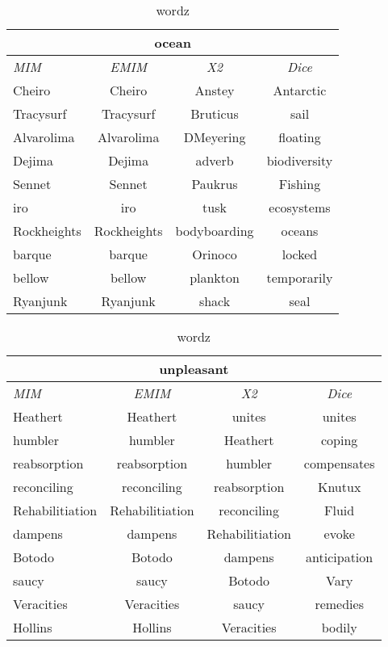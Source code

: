 \begin{table}[h!]
\centering
\begin{tabular}{ l | c | c | c }
\hline
\multicolumn{4}{c}{ocean}\\
\hline
\textit{MIM} & \textit{EMIM} & \textit{X2} & \textit{Dice}\\
\hline
Cheiro & Cheiro & Anstey & Antarctic\\
Tracysurf & Tracysurf & Bruticus & sail\\
Alvarolima & Alvarolima & DMeyering & floating\\
Dejima & Dejima & adverb & biodiversity\\
Sennet & Sennet & Paukrus & Fishing\\
iro & iro & tusk & ecosystems\\
Rockheights & Rockheights & bodyboarding & oceans\\
barque & barque & Orinoco & locked\\
bellow & bellow & plankton & temporarily\\
Ryanjunk & Ryanjunk & shack & seal\\
\hline
\end{tabular}
\caption{wordz}
\label{tab:words}
\end{table}
\begin{table}[h!]
\centering
\begin{tabular}{ l | c | c | c }
\hline
\multicolumn{4}{c}{unpleasant}\\
\hline
\textit{MIM} & \textit{EMIM} & \textit{X2} & \textit{Dice}\\
\hline
Heathert & Heathert & unites & unites\\
humbler & humbler & Heathert & coping\\
reabsorption & reabsorption & humbler & compensates\\
reconciling & reconciling & reabsorption & Knutux\\
Rehabilitiation & Rehabilitiation & reconciling & Fluid\\
dampens & dampens & Rehabilitiation & evoke\\
Botodo & Botodo & dampens & anticipation\\
saucy & saucy & Botodo & Vary\\
Veracities & Veracities & saucy & remedies\\
Hollins & Hollins & Veracities & bodily\\
\hline
\end{tabular}
\caption{wordz}
\label{tab:words}
\end{table}
